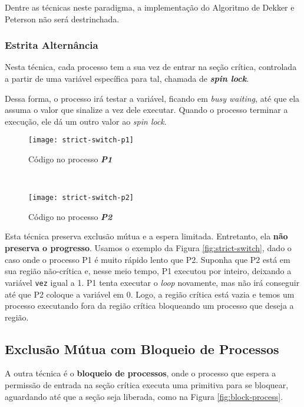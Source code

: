 Dentre as técnicas neste paradigma, a implementação do Algoritmo de Dekker e Peterson não será destrinchada.






\subsubsection{Estrita Alternância}
Nesta técnica, cada processo tem a sua vez de entrar na seção crítica, controlada a partir de uma variável específica para tal, chamada de \textbf{\textit{spin lock}}.

Dessa forma, o processo irá testar a variável, ficando em \textit{busy waiting}, até que ela assuma o valor que sinalize a vez dele executar. Quando o processo terminar a execução, ele dá um outro valor ao \textit{spin lock}.

\begin{figure*}[ht]
  \begin{subfigure}{0.5\textwidth}
    \centering
    \texttt{[image: strict-switch-p1]}
    \caption{Código no processo \textbf{\textit{P1}}}
  \end{subfigure}
  ~
  \begin{subfigure}{0.5\textwidth}
    \centering
    \texttt{[image: strict-switch-p2]}
    \caption{Código no processo \textbf{\textit{P2}}}
  \end{subfigure}

  \caption{Exemplo clássico de estrita alternância}
  \label{fig:strict-switch}
\end{figure*}

Esta técnica preserva exclusão mútua e a espera limitada. Entretanto, ela \textbf{não preserva o progresso}. Usamos o exemplo da Figura \ref{fig:strict-switch}, dado o caso onde o processo P1 é muito rápido lento que P2. Suponha que P2 está em sua região não-crítica e, nesse meio tempo, P1 executou por inteiro, deixando a variável \texttt{vez} igual a 1. P1 tenta executar o \textit{loop} novamente, mas não irá conseguir até que P2 coloque a variável em 0. Logo, a região crítica está vazia e temos um processo executando fora da região crítica bloqueando um processo que deseja a região.








\subsection{Exclusão Mútua com Bloqueio de Processos}
A outra técnica é o \textbf{bloqueio de processos}, onde o processo que espera a permissão de entrada na seção crítica executa uma primitiva para se bloquear, aguardando até que a seção seja liberada, como na Figura \ref{fig:block-process}.

